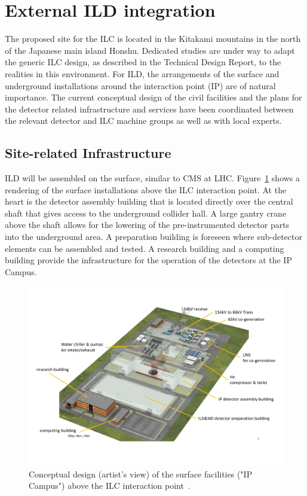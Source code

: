 \section{External ILD integration}
\label{ild:sec:external_integration}

The proposed site for the ILC is located in the Kitakami mountains in the north of the Japanese main island Honshu. Dedicated studies are under way to adapt the generic ILC design, as described in the Technical Design Report, to the realities in this environment. For ILD, the arrangements of the surface and underground installations around the interaction point (IP) are of natural importance. The current conceptual design of the civil facilities and the plans for the detector related infrastructure and services have been coordinated between the relevant detector and ILC machine groups as well as with local experts.

\subsection{Site-related Infrastructure}

ILD will be assembled on the surface, similar to CMS at LHC. Figure~\ref{fig:integration:surface} shows a rendering of the surface installations above the ILC interaction point. At the heart is the detector assembly building that is located directly over the central shaft that gives access to the underground collider hall. A large gantry crane above the shaft allows for the lowering of the pre-instrumented detector parts into the underground area. A preparation building is foreseen where sub-detector elements can be assembled and tested. A research building and a computing building provide the infrastructure for the operation of the detectors at the IP Campus. 

\begin{figure}[h!]
\includegraphics[width=1.0\hsize]{Integration/fig/Surface_Facilities.pdf}
\caption{\label{fig:integration:surface}Conceptual design (artist's view) of the surface facilities ("IP Campus") above the ILC interaction point~\cite{ild:bib:surface_facilities}. }
\end{figure}

